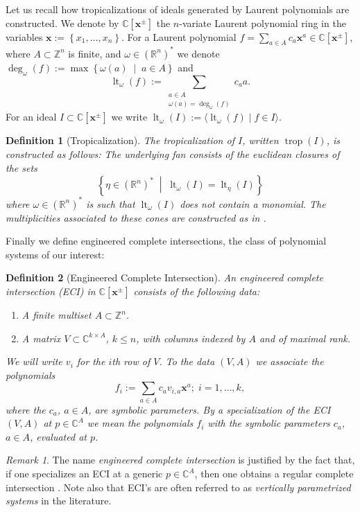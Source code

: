 \documentclass[a4paper]{article}
\newtheorem{definition}{Definition}
\theoremstyle{remark}
\newtheorem{remark}{Remark}
\newcommand{\set}[1]{\left\{#1\right\}}
\newcommand{\setdes}[2]{\left\{#1\;\middle|\;#2\right\}}
\def\RR{\mathbb{R}}
\def\CC{\mathbb{C}}
\def\ZZ{\mathbb{Z}}
\def\xx{\mathbf{x}}
\DeclareMathOperator{\lt}{lt}
\DeclareMathOperator{\trop}{trop}
\begin{document}
Let us recall how tropicalizations of ideals generated by Laurent
polynomials are constructed. We denote by $\CC[\xx^{\pm}]$ the
$n$-variate Laurent polynomial ring in the variables
$\xx:=\set{x_1,\hdots,x_n}$. For a Laurent polynomial
$f=\sum_{a\in A}c_a\xx^a\in \CC[\xx^{\pm}]$, where $A\subset \ZZ^n$ is finite, and
$\omega\in (\RR^n)^{*}$ we denote
$\deg_{\omega}(f) := \max\setdes{\omega(a)}{a\in A}$ and
\[\lt_{\omega}(f) := \sum_{\substack{a\in A\\ \omega(a) = \deg_{\omega}(f)}}c_aa.\]
For an ideal $I\subset \CC[\xx^{\pm}]$ we write $\lt_{\omega}(I):=\langle \lt_{\omega}(f)\;|\;f\in I\rangle$.
\begin{definition}[Tropicalization]
  The {\em tropicalization} of $I$, written $\trop(I)$, is constructed as follows:
  The underlying fan consists of the euclidean closures of the sets
  \[\setdes{\eta\in (\RR^n)^{*}}{\lt_{\omega}(I) = \lt_{\eta}(I)}\]
  where $\omega\in (\RR^n)^{*}$ is such that $\lt_{\omega}(I)$ does not contain a
  monomial. The multiplicities associated to these cones are constructed
  as in \cite[Section 3.4]{maclaganIntroductionTropicalGeometry2021}. 
\end{definition}

Finally we define engineered complete intersections, the class of polynomial systems
of our interest:
\begin{definition}[Engineered Complete Intersection]
  An {\em engineered complete intersection} (ECI) in $\CC[\xx^{\pm}]$
  consists of the following data:
  \begin{enumerate}
  \item A finite multiset $A\subset \ZZ^n$.
  \item A matrix $V\subset \CC^{k\times A}$, $k\leq n$, with columns indexed by
    $A$ and of maximal rank.
  \end{enumerate}
  We will write $v_i$ for the $i$th row of $V$. To the data $(V,A)$ we
  associate the polynomials
  \[f_i:=\sum_{a\in A}c_av_{i,a}\xx^a;\;i=1,\hdots,k,\] where the
  $c_a$, $a\in A$, are symbolic parameters. By a {\em specialization} of
  the ECI $(V,A)$ at $p\in \CC^A$ we mean the polynomials $f_i$ with the
  symbolic parameters $c_a$, $a\in A$, evaluated at $p$.
\end{definition}

\begin{remark}
  The name \textit{engineered complete intersection} is justified by
  the fact that, if one specializes an ECI at a generic $p\in \CC^A$,
  then one obtains a regular complete intersection \cite[Proposition
  4.3]{esterovEngineeredCompleteIntersections2024}. Note also that
  ECI's are often referred to as {\em vertically parametrized systems}
  in the literature.
\end{remark}
\end{document}
